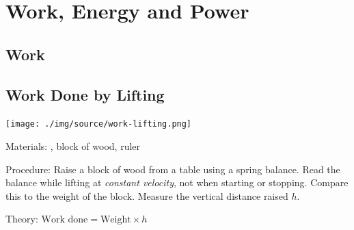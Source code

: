 \section{Work, Energy and Power}

\begin{multicols}{2}


\section*{Work}


\subsection{Work Done by Lifting}

\begin{center}
\texttt{[image: ./img/source/work-lifting.png]}
\end{center}

\begin{description*}
\item[Materials:]{, block of wood, ruler}
\item[Procedure:]{Raise a block of wood from a table using a spring balance. Read the balance while lifting at \emph{constant velocity}, not when starting or stopping. Compare this to the weight of the block. Measure the vertical distance raised $h$. }
\item[Theory:]{$\text{Work done} = \text{Weight} \times h$}
\end{description*}


\end{multicols}
